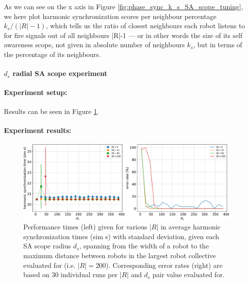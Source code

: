 				As we can see on the x axis in Figure \ref{fig:phase_sync_k_s_SA_scope_tuning}, we here plot harmonic synchronization scores per neighbour percentage $k_s/(|R|-1)$, which tells us the ratio of closest neighbours each robot listens to for fire signals out of all neighbours |R|-1 — or in other words the size of its self awareness scope, not given in absolute number of neighbours $k_s$, but in terms of the percentage of its neighbours.
				
				 
				 
			\paragraph{$d_s$ radial SA scope experiment}
			
				\paragraph{Experiment setup:\nl}
				
				Results can be seen in Figure \ref{fig:phase_sync_d_s_SA_scope_tuning}.
				
				\paragraph{Experiment results:\nl}
				
				\begin{figure}[ht!]
					\centering
					\includegraphics[width=\linewidth]{Assets/DocSegments/Chapters/ExperimentsAndResults/Figures/PerfScores/phase_sync_d_s_SA_scope_tuning_experiment_performance.pdf}
					\caption[Experiment results for $\phi$ synchronization $d_s$ SA scope tuning experiment.]{Performance times (left) given for various $|R|$ in average harmonic synchronization times (sim s) with standard deviation, given each SA scope radius $d_s$, spanning from the width of a robot to the maximum distance between robots in the largest robot collective evaluated for (i.e. $|R|=200$). Corresponding error rates (right) are based on 30 individual runs per $|R|$ and $d_s$ pair value evaluated for.}
					\label{fig:phase_sync_d_s_SA_scope_tuning}
				\end{figure}
				

